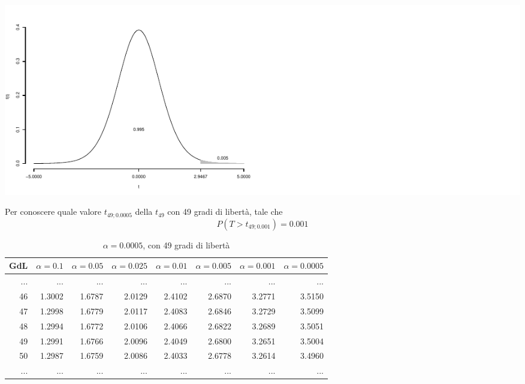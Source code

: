 \documentclass[
  11pt,
]{book}
\theoremstyle{mytheoremstyle}
\theoremstyle{mydefstyle}
\begin{document}
\begin{center}\includegraphics{Appunti_di_Statistica_2025_files/figure-latex/09-Statistiche-Campionarie_2-1} \end{center}

Per conoscere quale valore \(t_{49;0.0005}\) della \(t_{49}\) con 49 gradi di libertà, tale che
\[P(T>t_{49;0.001})=0.001\]

\begin{table}
\centering
\caption{\label{tab:09-Statistiche-Campionarie-7}$\alpha=0.0005$, con 49 gradi di libertà}
\centering
\fontsize{7}{9}\selectfont
\begin{tabular}[t]{rrrrrr|>{}r|r}
\toprule
GdL & $\alpha=0.1$ & $\alpha=0.05$ & $\alpha=0.025$ & $\alpha=0.01$ & $\alpha=0.005$ & $\alpha=0.001$ & $\alpha=0.0005$\\
\midrule
... & ... & ... & ... & ... & ... & \textcolor[HTML]{AB292E}{...} & \vphantom{1} ...\\
46 & 1.3002 & 1.6787 & 2.0129 & 2.4102 & 2.6870 & \textcolor[HTML]{AB292E}{3.2771} & 3.5150\\
47 & 1.2998 & 1.6779 & 2.0117 & 2.4083 & 2.6846 & \textcolor[HTML]{AB292E}{3.2729} & 3.5099\\
48 & 1.2994 & 1.6772 & 2.0106 & 2.4066 & 2.6822 & \textcolor[HTML]{AB292E}{3.2689} & 3.5051\\
\midrule
\textcolor[HTML]{AB292E}{49} & \textcolor[HTML]{AB292E}{1.2991} & \textcolor[HTML]{AB292E}{1.6766} & \textcolor[HTML]{AB292E}{2.0096} & \textcolor[HTML]{AB292E}{2.4049} & \textcolor[HTML]{AB292E}{2.6800} & \textcolor[HTML]{AB292E}{3.2651} & \textcolor[HTML]{AB292E}{3.5004}\\
\midrule
50 & 1.2987 & 1.6759 & 2.0086 & 2.4033 & 2.6778 & \textcolor[HTML]{AB292E}{3.2614} & 3.4960\\
... & ... & ... & ... & ... & ... & \textcolor[HTML]{AB292E}{...} & ...\\
\bottomrule
\end{tabular}
\end{table}
\end{document}
